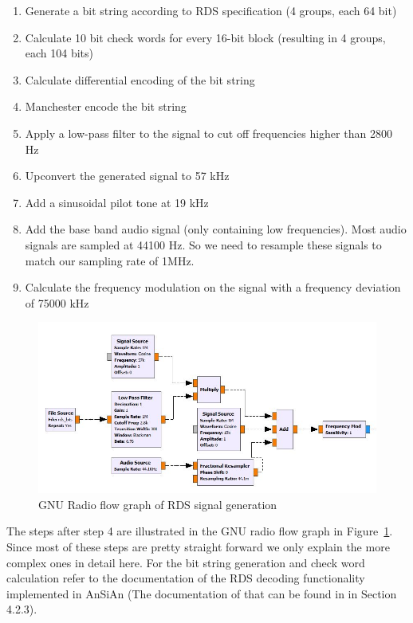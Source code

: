 \begin{enumerate}
	\item Generate a bit string according to RDS specification (4 groups, each 64 bit)
	\item Calculate 10 bit check words for every 16-bit block (resulting in 4 groups, each 104 bits)
	\item Calculate differential encoding of the bit string
	\item Manchester encode the bit string
	\item Apply a low-pass filter to the signal to cut off frequencies higher than 2800 Hz
	\item Upconvert the generated signal to 57 kHz
	\item Add a sinusoidal pilot tone at 19 kHz
	\item Add the base band audio signal (only containing low frequencies). Most audio signals are sampled at 44100 Hz. So we need to resample these signals to match our sampling rate of 1MHz. 
	\item Calculate the frequency modulation on the signal with a frequency deviation of 75000 kHz 	
\end{enumerate}

\begin{figure}
	\centering
	\includegraphics[width=1.3\linewidth]{gfx/rds_gnu.jpg}
	\caption{GNU Radio flow graph of RDS signal generation}
	\label{fig:impl:rdsgnu}
\end{figure}

The steps after step 4 are illustrated in the GNU radio flow graph in Figure~\ref{fig:impl:rdsgnu}. Since most of these steps are pretty straight forward we only explain the more complex ones in detail here. For the bit string generation and check word calculation refer to the documentation of the RDS decoding functionality implemented in AnSiAn (The documentation of that can be found in \cite{Mantz2016} in Section 4.2.3). 

